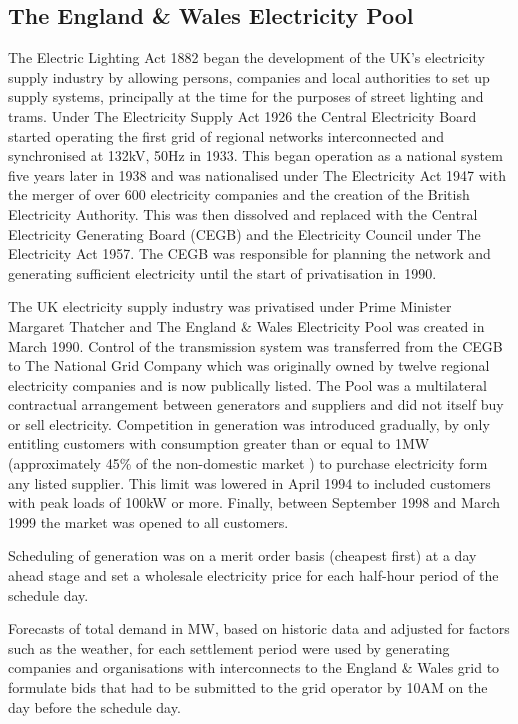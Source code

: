 \subsection{The England \& Wales Electricity Pool}
\label{sec:thepool}
The Electric Lighting Act 1882 began the development of the UK's electricity
supply industry by allowing persons, companies and local authorities to set up
supply systems, principally at the time for the purposes of street lighting and
trams.  Under The Electricity Supply Act 1926 the Central Electricity Board
started operating the first grid of regional networks interconnected and
synchronised at 132kV, 50Hz in 1933.  This began operation as a national system
five years later in 1938 and was nationalised under The Electricity Act 1947
with the merger of over 600 electricity companies and the creation of the
British Electricity Authority.  This was then dissolved and replaced with the
Central Electricity Generating Board (CEGB) and the Electricity Council under
The Electricity Act 1957.  The CEGB was responsible for planning the network
and generating sufficient electricity until the start of privatisation in 1990.

The UK electricity supply industry was privatised under Prime Minister
Margaret Thatcher and The England \& Wales Electricity Pool was created in
March 1990.  Control of the transmission system was transferred from the
CEGB to The National Grid Company which was originally owned by twelve regional
electricity companies and is now publically listed.  The Pool was a
multilateral contractual arrangement between generators and suppliers and did
not itself buy or sell electricity.  Competition in generation was introduced
gradually, by only entitling customers with consumption greater than or equal
to 1MW (approximately 45\% of the non-domestic market \cite{decc:dukes09}) to
purchase electricity form any listed supplier.  This limit was lowered in April
1994 to included customers with peak loads of 100kW or more.  Finally, between
September 1998 and March 1999 the market was opened to all customers.

Scheduling of generation was on a merit order basis (cheapest first) at a day
ahead stage and set a wholesale electricity price for each half-hour period of
the schedule day.

Forecasts of total demand in MW, based on historic data and adjusted for
factors such as the weather, for each settlement period were used by generating
companies and organisations with interconnects to the England \& Wales grid to
formulate bids that had to be submitted to the grid operator by 10AM on the day
before the schedule day.

